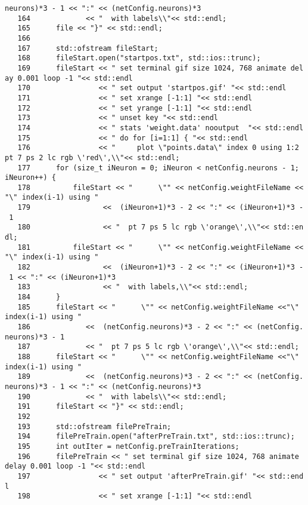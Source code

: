 \begin{verbatim}
neurons)*3 - 1 << ":" << (netConfig.neurons)*3
   164             << "  with labels\\"<< std::endl;
   165      file << "}" << std::endl;
   166
   167      std::ofstream fileStart;
   168      fileStart.open("startpos.txt", std::ios::trunc);
   169      fileStart << " set terminal gif size 1024, 768 animate del
ay 0.001 loop -1 "<< std::endl
   170                << " set output 'startpos.gif' "<< std::endl
   171                << " set xrange [-1:1] "<< std::endl
   172                << " set yrange [-1:1] "<< std::endl
   173                << " unset key "<< std::endl              
   174                << " stats 'weight.data' nooutput  "<< std::endl
   175                << " do for [i=1:1] { "<< std::endl
   176                << "     plot \"points.data\" index 0 using 1:2 
pt 7 ps 2 lc rgb \'red\',\\"<< std::endl;
   177      for (size_t iNeuron = 0; iNeuron < netConfig.neurons - 1; 
iNeuron++) {
   178          fileStart << "      \"" << netConfig.weightFileName <<
"\" index(i-1) using " 
   179                 <<  (iNeuron+1)*3 - 2 << ":" << (iNeuron+1)*3 -
 1
   180                 << "  pt 7 ps 5 lc rgb \'orange\',\\"<< std::en
dl;
   181          fileStart << "      \"" << netConfig.weightFileName <<
"\" index(i-1) using " 
   182                 <<  (iNeuron+1)*3 - 2 << ":" << (iNeuron+1)*3 -
 1 << ":" << (iNeuron+1)*3
   183                 << "  with labels,\\"<< std::endl;
   184      }
   185      fileStart << "      \"" << netConfig.weightFileName <<"\" 
index(i-1) using " 
   186             <<  (netConfig.neurons)*3 - 2 << ":" << (netConfig.
neurons)*3 - 1
   187             << "  pt 7 ps 5 lc rgb \'orange\',\\"<< std::endl;
   188      fileStart << "      \"" << netConfig.weightFileName <<"\" 
index(i-1) using " 
   189             <<  (netConfig.neurons)*3 - 2 << ":" << (netConfig.
neurons)*3 - 1 << ":" << (netConfig.neurons)*3
   190             << "  with labels\\"<< std::endl;
   191      fileStart << "}" << std::endl;
   192
   193      std::ofstream filePreTrain;
   194      filePreTrain.open("afterPreTrain.txt", std::ios::trunc);
   195      int outIter = netConfig.preTrainIterations;
   196      filePreTrain << " set terminal gif size 1024, 768 animate 
delay 0.001 loop -1 "<< std::endl
   197                << " set output 'afterPreTrain.gif' "<< std::end
l
   198                << " set xrange [-1:1] "<< std::endl

\end{verbatim}
